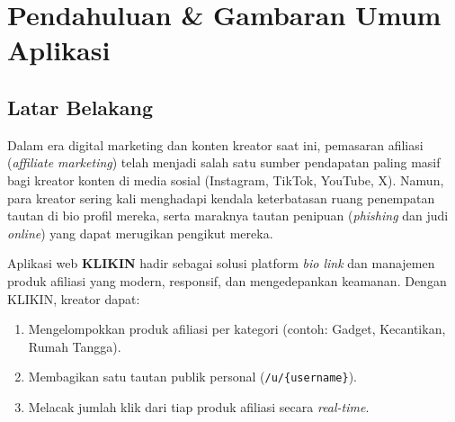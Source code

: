 \documentclass[12pt,a4paper]{article}
\begin{document}
\hypersetup{pageanchor=true}
\tableofcontents
\newpage
\listoffigures
\listoftables
\newpage
{}

\section{Pendahuluan \& Gambaran Umum Aplikasi}

\subsection{Latar Belakang}
Dalam era digital marketing dan konten kreator saat ini, pemasaran afiliasi (\textit{affiliate marketing}) telah menjadi salah satu sumber pendapatan paling masif bagi kreator konten di media sosial (Instagram, TikTok, YouTube, X). Namun, para kreator sering kali menghadapi kendala keterbatasan ruang penempatan tautan di bio profil mereka, serta maraknya tautan penipuan (\textit{phishing} dan judi \textit{online}) yang dapat merugikan pengikut mereka.

Aplikasi web \textbf{KLIKIN} hadir sebagai solusi platform \textit{bio link} dan manajemen produk afiliasi yang modern, responsif, dan mengedepankan keamanan. Dengan KLIKIN, kreator dapat:
\begin{enumerate}[noitemsep]
    \item Mengelompokkan produk afiliasi per kategori (contoh: Gadget, Kecantikan, Rumah Tangga).
    \item Membagikan satu tautan publik personal (\texttt{/u/\{username\}}).
    \item Melacak jumlah klik dari tiap produk afiliasi secara \textit{real-time}.
\end{enumerate}
\end{document}
